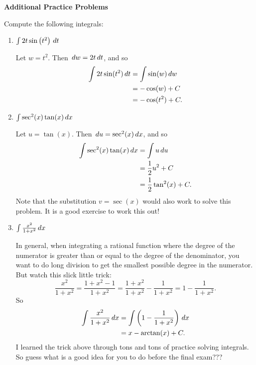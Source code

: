 \documentclass[handout,nooutcomes]{ximera}
\begin{document}
\newpage
\begin{center}
\begin{large}
{\bf  Additional Practice Problems}
\end{large}
\end{center}







\begin{problem}
Compute the following integrals:

	\begin{multicols}{2}
	\begin{enumerate}
	
	\item  $\int 2t \sin \left( t^2 \right) \,d t$
		\begin{freeResponse}
		Let $w=t^2$.  Then $\,d w = 2t \,d t$, and so
			\begin{align*}
			\int 2t \sin(t^2) \,d t &= \int \sin(w) \,d w  \\
			&= - \cos(w) + C  \\
			&= - \cos(t^2) + C.
			\end{align*}
		\end{freeResponse}
		
		
		
	\item  $\int \sec^2(x) \tan(x) \,d x$
		\begin{freeResponse}
		Let $u = \tan(x)$.  Then $\,d u = \sec^2 (x) \,d x$, and so
			\begin{align*}
			\int \sec^2(x) \tan(x) \,d x &= \int u \,d u  \\
			&= \frac{1}{2} u^2 + C  \\
			&= \frac{1}{2} \tan^2(x) + C.
			\end{align*}
		Note that the substitution $v=\sec(x)$ would also work to solve this problem.  
		It is a good exercise to work this out!
		\end{freeResponse}
		

	
	\item  $\int \frac{x^2 }{1 + x^2} \,d x$
		\begin{freeResponse}
		In general, when integrating a rational function where the degree of the numerator is greater than or equal to the degree
		of the denominator, you want to do long division to get the smallest possible degree in the numerator.  
		But watch this slick little trick:
			\begin{equation*}
			\frac{x^2}{1+x^2} = \frac{1 + x^2 - 1}{1+x^2} = \frac{1+x^2}{1+x^2} - \frac{1}{1+x^2} = 1 - \frac{1}{1+x^2}.
			\end{equation*}
		So
			\begin{align*}
			\int \frac{x^2 }{1 + x^2} \,d x &= \int \left( 1 - \frac{1}{1+x^2} \right) \,d x  \\
			&= x - \arctan(x) + C.
			\end{align*}
		I learned the trick above through tons and tons of practice solving integrals.  
		So guess what is a good idea for you to do before the final exam???
		\end{freeResponse}
		

\end{enumerate}
\end{multicols}
\end{problem}
\end{document}
